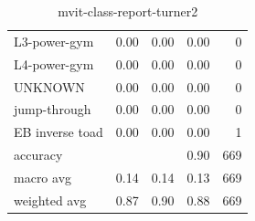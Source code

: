 \begin{table}[h!]
\begin{tabular}{|l|r|r|r|r|}
          L3-power-gym &       0.00 &     0.00 &     0.00 &        0 \\
          L4-power-gym &       0.00 &     0.00 &     0.00 &        0 \\
               UNKNOWN &       0.00 &     0.00 &     0.00 &        0 \\
          jump-through &       0.00 &     0.00 &     0.00 &        0 \\
       EB inverse toad &       0.00 &     0.00 &     0.00 &        1 \\ \hline
              accuracy &            &          &     0.90 &      669 \\
             macro avg &       0.14 &     0.14 &     0.13 &      669 \\
          weighted avg &       0.87 &     0.90 &     0.88 &      669 \\
         \hline
    \end{tabular}
    \caption{mvit-class-report-turner2}
    \label{tbl:mvit-class-report-turner2}
\end{table}

